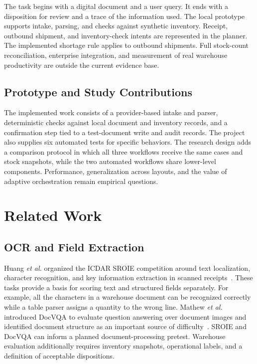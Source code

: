 \documentclass[conference]{IEEEtran}
\begin{document}
The task begins with a digital document and a user query. It ends with a disposition for review and a trace of the information used. The local prototype supports intake, parsing, and checks against synthetic inventory. Receipt, outbound shipment, and inventory-check intents are represented in the planner. The implemented shortage rule applies to outbound shipments. Full stock-count reconciliation, enterprise integration, and measurement of real warehouse productivity are outside the current evidence base.

\subsection{Prototype and Study Contributions}
The implemented work consists of a provider-based intake and parser, deterministic checks against local document and inventory records, and a confirmation step tied to a test-document write and audit records. The project also supplies six automated tests for specific behaviors. The research design adds a comparison protocol in which all three workflows receive the same cases and stock snapshots, while the two automated workflows share lower-level components. Performance, generalization across layouts, and the value of adaptive orchestration remain empirical questions.

\section{Related Work}
\subsection{OCR and Field Extraction}
Huang \emph{et al.} organized the ICDAR SROIE competition around text localization, character recognition, and key information extraction in scanned receipts~\cite{sroie}. These tasks provide a basis for scoring text and structured fields separately. For example, all the characters in a warehouse document can be recognized correctly while a table parser assigns a quantity to the wrong line. Mathew \emph{et al.} introduced DocVQA to evaluate question answering over document images and identified document structure as an important source of difficulty~\cite{docvqa}. SROIE and DocVQA can inform a planned document-processing pretest. Warehouse evaluation additionally requires inventory snapshots, operational labels, and a definition of acceptable dispositions.
\end{document}
